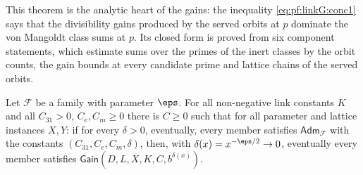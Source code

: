 This theorem is the analytic heart of the gains: the inequality \eqref{eq:pf:linkG:conc1} says that the divisibility
gains produced by the served orbits at $p$ dominate the von Mangoldt class sums at $p$. Its closed form is proved from
six component statements, which estimate sums over the primes of the inert classes by the orbit counts, the gain bounds at
every candidate prime and lattice chains of the served orbits.

\begin{theorem}\label{pf:linkG:stmtEF}
Let $\mathcal F$ be a family with parameter $\eps$. For all non-negative link constants $K$ and all $C_{31}>0$,
$C_e,C_m\ge0$ there is $C\ge0$ such that for all parameter and lattice instances $X,Y$: if for every $\delta>0$, eventually,
every member satisfies $\mathsf{Adm}_{\mathcal F}$ with the constants $(C_{31},C_e,C_m,\delta)$, then, with
$\delta(x)=x^{-\eps/2}\to0$, eventually every member satisfies $\mathsf{Gain}(D,L,X,K,C,b^{\delta(x)})$.
\end{theorem}

